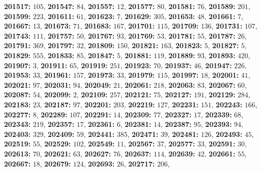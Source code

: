 \textsf{\bfseries 201517:} $105$, \textsf{\bfseries 201547:} $84$, \textsf{\bfseries 201557:} $12$, \textsf{\bfseries 201577:} $80$, \textsf{\bfseries 201581:} $76$, \textsf{\bfseries 201589:} $201$, \textsf{\bfseries 201599:} $223$, \textsf{\bfseries 201611:} $61$, \textsf{\bfseries 201623:} $7$, \textsf{\bfseries 201629:} $305$, \textsf{\bfseries 201653:} $48$, \textsf{\bfseries 201661:} $7$, \textsf{\bfseries 201667:} $13$, \textsf{\bfseries 201673:} $71$, \textsf{\bfseries 201683:} $167$, \textsf{\bfseries 201701:} $115$, \textsf{\bfseries 201709:} $136$, \textsf{\bfseries 201731:} $107$, \textsf{\bfseries 201743:} $111$, \textsf{\bfseries 201757:} $50$, \textsf{\bfseries 201767:} $93$, \textsf{\bfseries 201769:} $53$, \textsf{\bfseries 201781:} $55$, \textsf{\bfseries 201787:} $26$, \textsf{\bfseries 201791:} $369$, \textsf{\bfseries 201797:} $32$, \textsf{\bfseries 201809:} $150$, \textsf{\bfseries 201821:} $163$, \textsf{\bfseries 201823:} $5$, \textsf{\bfseries 201827:} $5$, \textsf{\bfseries 201829:} $555$, \textsf{\bfseries 201833:} $85$, \textsf{\bfseries 201847:} $5$, \textsf{\bfseries 201881:} $119$, \textsf{\bfseries 201889:} $93$, \textsf{\bfseries 201893:} $420$, \textsf{\bfseries 201907:} $3$, \textsf{\bfseries 201911:} $65$, \textsf{\bfseries 201919:} $251$, \textsf{\bfseries 201923:} $70$, \textsf{\bfseries 201937:} $46$, \textsf{\bfseries 201947:} $226$, \textsf{\bfseries 201953:} $33$, \textsf{\bfseries 201961:} $157$, \textsf{\bfseries 201973:} $33$, \textsf{\bfseries 201979:} $115$, \textsf{\bfseries 201997:} $18$, \textsf{\bfseries 202001:} $41$, \textsf{\bfseries 202021:} $97$, \textsf{\bfseries 202031:} $94$, \textsf{\bfseries 202049:} $21$, \textsf{\bfseries 202061:} $218$, \textsf{\bfseries 202063:} $83$, \textsf{\bfseries 202067:} $60$, \textsf{\bfseries 202087:} $54$, \textsf{\bfseries 202099:} $2$, \textsf{\bfseries 202109:} $257$, \textsf{\bfseries 202121:} $75$, \textsf{\bfseries 202127:} $191$, \textsf{\bfseries 202129:} $284$, \textsf{\bfseries 202183:} $23$, \textsf{\bfseries 202187:} $97$, \textsf{\bfseries 202201:} $203$, \textsf{\bfseries 202219:} $127$, \textsf{\bfseries 202231:} $151$, \textsf{\bfseries 202243:} $166$, \textsf{\bfseries 202277:} $8$, \textsf{\bfseries 202289:} $107$, \textsf{\bfseries 202291:} $14$, \textsf{\bfseries 202309:} $77$, \textsf{\bfseries 202327:} $17$, \textsf{\bfseries 202339:} $68$, \textsf{\bfseries 202343:} $219$, \textsf{\bfseries 202357:} $17$, \textsf{\bfseries 202361:} $6$, \textsf{\bfseries 202381:} $14$, \textsf{\bfseries 202387:} $95$, \textsf{\bfseries 202393:} $94$, \textsf{\bfseries 202403:} $329$, \textsf{\bfseries 202409:} $59$, \textsf{\bfseries 202441:} $385$, \textsf{\bfseries 202471:} $39$, \textsf{\bfseries 202481:} $126$, \textsf{\bfseries 202493:} $45$, \textsf{\bfseries 202519:} $55$, \textsf{\bfseries 202529:} $102$, \textsf{\bfseries 202549:} $11$, \textsf{\bfseries 202567:} $37$, \textsf{\bfseries 202577:} $33$, \textsf{\bfseries 202591:} $30$, \textsf{\bfseries 202613:} $70$, \textsf{\bfseries 202621:} $63$, \textsf{\bfseries 202627:} $76$, \textsf{\bfseries 202637:} $114$, \textsf{\bfseries 202639:} $42$, \textsf{\bfseries 202661:} $55$, \textsf{\bfseries 202667:} $18$, \textsf{\bfseries 202679:} $124$, \textsf{\bfseries 202693:} $26$, \textsf{\bfseries 202717:} $206$, 
